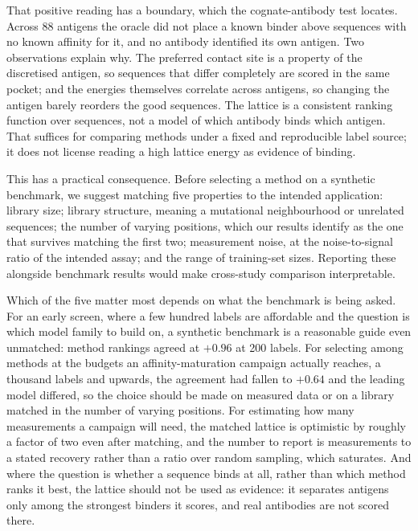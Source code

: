 \documentclass[pdflatex,sn-nature]{sn-jnl}
\theoremstyle{thmstyleone}
\theoremstyle{thmstyletwo}
\theoremstyle{thmstylethree}
\begin{document}
That positive reading has a boundary, which the cognate-antibody test locates.
Across 88 antigens the oracle did not place a known binder above sequences with
no known affinity for it, and no antibody identified its own antigen. Two
observations explain why. The preferred contact site is a property of the
discretised antigen, so sequences that differ completely are scored in the same
pocket; and the energies themselves correlate across antigens, so changing the
antigen barely reorders the good sequences. The lattice is a consistent ranking
function over sequences, not a model of which antibody binds which antigen.
That suffices for comparing methods under a fixed and reproducible label
source; it does not license reading a high lattice energy as evidence of
binding.

This has a practical consequence. Before selecting a method on a synthetic
benchmark, we suggest matching five properties to the intended application:
library size; library structure, meaning a mutational neighbourhood or
unrelated sequences; the number of varying positions, which our results
identify as the one that survives matching the first two; measurement noise, at
the noise-to-signal ratio of the intended assay; and the range of training-set
sizes. Reporting these alongside benchmark results would make cross-study
comparison interpretable.

Which of the five matter most depends on what the benchmark is being asked.
For an early screen, where a few hundred labels are affordable and the question
is which model family to build on, a synthetic benchmark is a reasonable guide
even unmatched: method rankings agreed at $+0.96$ at 200 labels. For selecting
among methods at the budgets an affinity-maturation campaign actually reaches,
a thousand labels and upwards, the agreement had fallen to $+0.64$ and the
leading model differed, so the choice should be made on measured data or on a
library matched in the number of varying positions. For estimating how many
measurements a campaign will need, the matched lattice is optimistic by roughly
a factor of two even after matching, and the number to report is measurements
to a stated recovery rather than a ratio over random sampling, which saturates.
And where the question is whether a sequence binds at all, rather than which
method ranks it best, the lattice should not be used as evidence: it separates
antigens only among the strongest binders it scores, and real antibodies are
not scored there.
\end{document}
